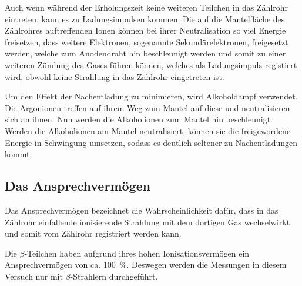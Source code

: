 Auch wenn während der Erholungszeit keine weiteren Teilchen in das
Zählrohr eintreten, kann es zu Ladungsimpulsen kommen. Die auf die
Mantelfläche des Zählrohres auftreffenden Ionen können bei ihrer
Neutralisation so viel Energie freisetzen, dass weitere Elektronen,
sogenannte Sekundärelektronen, freigesetzt werden, welche zum
Anodendraht hin beschleunigt werden und somit zu einer weiteren Zündung
des Gases führen können, welches als Ladungsimpuls registiert wird,
obwohl keine Strahlung in das Zählrohr eingetreten ist.

Um den Effekt der Nachentladung zu minimieren, wird Alkoholdampf
verwendet. Die Argonionen treffen auf ihrem Weg zum Mantel auf diese und
neutralisieren sich an ihnen. Nun werden die Alkoholionen zum Mantel hin
beschleunigt. Werden die Alkoholionen am Mantel neutralisiert, können
sie die freigewordene Energie in Schwingung umsetzen, sodass es deutlich
seltener zu Nachentladungen kommt.
%
\subsection{Das Ansprechvermögen}
%
Das Ansprechvermögen bezeichnet die Wahrscheinlichkeit dafür, dass in
das Zählrohr einfallende ionisierende Strahlung mit dem dortigen Gas
wechselwirkt und somit vom Zählrohr registriert werden kann.

Die $\beta$-Teilchen haben aufgrund ihres hohen Ionisationsvermögen ein
Ansprechvermögen von ca. \SI{100}{\percent}.  Deswegen werden die
Messungen in diesem Versuch nur mit $\beta$-Strahlern durchgeführt.

\FloatBarrier
%